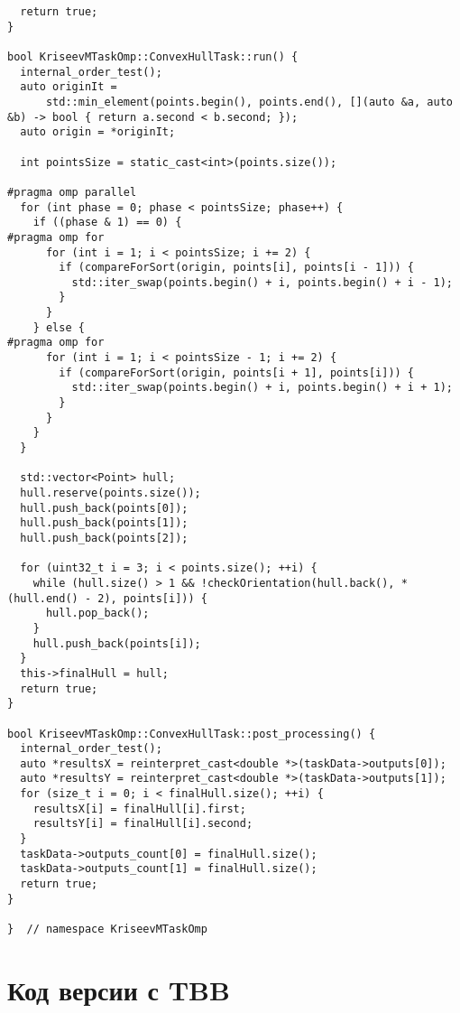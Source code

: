 \documentclass[a4paper,12pt]{article}
\begin{document}
\begin{lstlisting}
  return true;
}

bool KriseevMTaskOmp::ConvexHullTask::run() {
  internal_order_test();
  auto originIt =
      std::min_element(points.begin(), points.end(), [](auto &a, auto &b) -> bool { return a.second < b.second; });
  auto origin = *originIt;

  int pointsSize = static_cast<int>(points.size());

#pragma omp parallel
  for (int phase = 0; phase < pointsSize; phase++) {
    if ((phase & 1) == 0) {
#pragma omp for
      for (int i = 1; i < pointsSize; i += 2) {
        if (compareForSort(origin, points[i], points[i - 1])) {
          std::iter_swap(points.begin() + i, points.begin() + i - 1);
        }
      }
    } else {
#pragma omp for
      for (int i = 1; i < pointsSize - 1; i += 2) {
        if (compareForSort(origin, points[i + 1], points[i])) {
          std::iter_swap(points.begin() + i, points.begin() + i + 1);
        }
      }
    }
  }

  std::vector<Point> hull;
  hull.reserve(points.size());
  hull.push_back(points[0]);
  hull.push_back(points[1]);
  hull.push_back(points[2]);

  for (uint32_t i = 3; i < points.size(); ++i) {
    while (hull.size() > 1 && !checkOrientation(hull.back(), *(hull.end() - 2), points[i])) {
      hull.pop_back();
    }
    hull.push_back(points[i]);
  }
  this->finalHull = hull;
  return true;
}

bool KriseevMTaskOmp::ConvexHullTask::post_processing() {
  internal_order_test();
  auto *resultsX = reinterpret_cast<double *>(taskData->outputs[0]);
  auto *resultsY = reinterpret_cast<double *>(taskData->outputs[1]);
  for (size_t i = 0; i < finalHull.size(); ++i) {
    resultsX[i] = finalHull[i].first;
    resultsY[i] = finalHull[i].second;
  }
  taskData->outputs_count[0] = finalHull.size();
  taskData->outputs_count[1] = finalHull.size();
  return true;
}

}  // namespace KriseevMTaskOmp
\end{lstlisting}

\section{Код версии с TBB}
\end{document}
